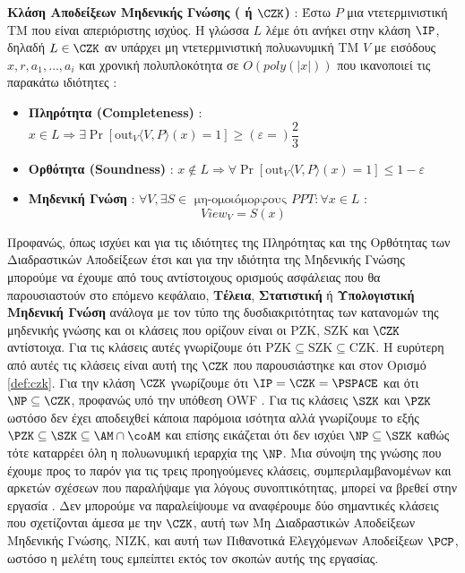 \begin{definition}
\label{def:czk}
\textbf{Κλάση Αποδείξεων Μηδενικής Γνώσης ( ή $\CZK$)} : Έστω $P$ μια ντετερμινιστική ΤΜ που είναι απεριόριστης ισχύος. Η γλώσσα $L$ λέμε ότι ανήκει στην κλάση $\IP$, δηλαδή $L \in \CZK$ αν υπάρχει μη ντετερμινιστική πολυωνυμική ΤΜ $V$ με εισόδους $x, r, a_{1}, \ldots, a_{i}$ και χρονική πολυπλοκότητα σε $O(poly(|x|))$ που ικανοποιεί τις παρακάτω ιδιότητες :
\begin{itemize}
    \item \textbf{Πληρότητα (Completeness)} : $x \in L \Rightarrow \exists \operatorname{Pr}\left[\text{out}_{V}\langle V, P\rangle(x)=1\right] \geq (ε=) \dfrac{2}{3}$
    \item \textbf{Ορθότητα (Soundness)} : $x \notin L \Rightarrow \forall \operatorname{Pr}\left[\text{out}_{V}\langle V, P\rangle(x)=1\right] \leq 1 - ε$
    \item \textbf{Μηδενική Γνώση} : $\forall V, \exists S \in \text{ μη-ομοιόμορφους } PPT : \forall x \in L$ :
    \[
    View_V = S(x)
    \]
\end{itemize}
\end{definition}

Προφανώς, όπως ισχύει και για τις ιδιότητες της Πληρότητας και της Ορθότητας των Διαδραστικών Αποδείξεων έτσι και για την ιδιότητα της Μηδενικής Γνώσης μπορούμε να έχουμε από τους αντίστοιχους ορισμούς ασφάλειας που θα παρουσιαστούν στο επόμενο κεφάλαιο, \textbf{Τέλεια}, \textbf{Στατιστική} ή \textbf{Υπολογιστική Μηδενική Γνώση} ανάλογα με τον τύπο της δυσδιακριτότητας των κατανομών της μηδενικής γνώσης και οι κλάσεις που ορίζουν είναι οι PZK, SZK και $\CZK$ αντίστοιχα. Για τις κλάσεις αυτές γνωρίζουμε ότι $\text{PZK} \subseteq \text{SZK} \subseteq \text{CZK}$. Η ευρύτερη από αυτές τις κλάσεις είναι αυτή της $\CZK$ που παρουσιάστηκε και στον Ορισμό \ref{def:czk}. Για την κλάση $\CZK$ γνωρίζουμε ότι $\IP=\CZK=\PSPACE$ και ότι $\NP \subseteq \CZK$, προφανώς υπό την υπόθεση OWF \cite{ben1988everything}. Για τις κλάσεις $\SZK$ και $\PZK$ ωστόσο δεν έχει αποδειχθεί κάποια παρόμοια ισότητα αλλά γνωρίζουμε το εξής $\PZK \subseteq \SZK \subseteq \AM \cap \coAM$ και επίσης εικάζεται ότι δεν ισχύει $\NP \subseteq \SZK$ καθώς τότε καταρρέει όλη η πολυωνυμική ιεραρχία της $\NP$. Μια σύνοψη της γνώσης που έχουμε προς το παρόν για τις τρεις προηγούμενες κλάσεις, συμπεριλαμβανομένων και αρκετών σχέσεων που παραλήψαμε για λόγους συνοπτικότητας, μπορεί να βρεθεί στην εργασία \cite{couteau2017zero}. Δεν μπορούμε να παραλείψουμε να αναφέρουμε δύο σημαντικές κλάσεις που σχετίζονται άμεσα με την $\CZK$, αυτή των Μη Διαδραστικών Αποδείξεων Μηδενικής Γνώσης, NIZK, και αυτή των Πιθανοτικά Ελεγχόμενων Αποδείξεων $\PCP$, ωστόσο η μελέτη τους εμπείπτει εκτός τον σκοπών αυτής της εργασίας.


